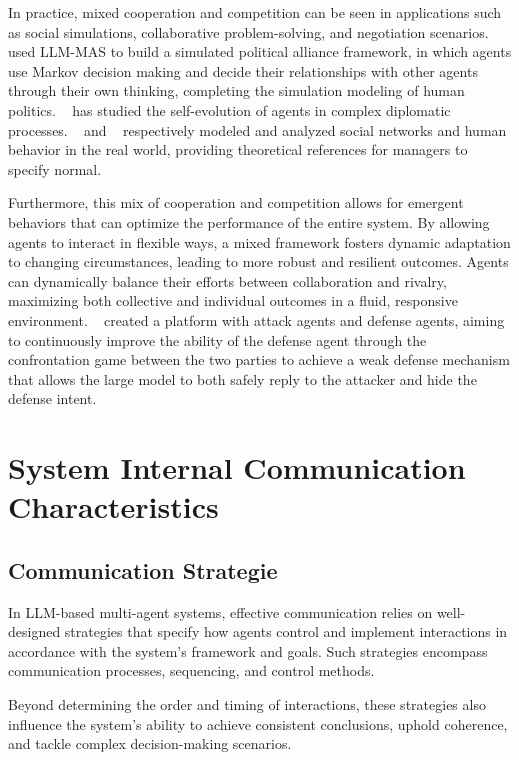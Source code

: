 In practice, mixed cooperation and competition can be seen in applications such as social simulations, collaborative problem-solving, and negotiation scenarios. ~\cite{polca_mas_for_political} used LLM-MAS to build a simulated political alliance framework, in which agents use Markov decision making and decide their relationships with other agents through their own thinking, completing the simulation modeling of human politics. ~\cite{richeliey_diplomacy_society} has studied the self-evolution of agents in complex diplomatic processes. ~\cite{community_knowledge_flooding} and ~\cite{sct_society} respectively modeled and analyzed social networks and human behavior in the real world, providing theoretical references for managers to specify normal.

Furthermore, this mix of cooperation and competition allows for emergent behaviors that can optimize the performance of the entire system. By allowing agents to interact in flexible ways, a mixed framework fosters dynamic adaptation to changing circumstances, leading to more robust and resilient outcomes. Agents can dynamically balance their efforts between collaboration and rivalry, maximizing both collective and individual outcomes in a fluid, responsive environment. ~\cite{mas_for_defence_attack} created a platform with attack agents and defense agents, aiming to continuously improve the ability of the defense agent through the confrontation game between the two parties to achieve a weak defense mechanism that allows the large model to both safely reply to the attacker and hide the defense intent.

\section{System Internal Communication Characteristics}
\subsection{Communication Strategie}
In LLM-based multi-agent systems, effective communication relies on well-designed strategies that specify how agents control and implement interactions in accordance with the system’s framework and goals. Such strategies encompass communication processes, sequencing, and control methods.

Beyond determining the order and timing of interactions, these strategies also influence the system's ability to achieve consistent conclusions, uphold coherence, and tackle complex decision-making scenarios.

